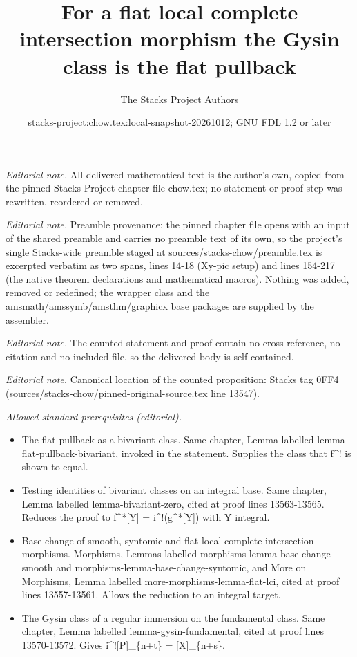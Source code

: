 \documentclass[10pt,a4paper]{amsart}
\title{For a flat local complete intersection morphism the Gysin class is the flat pullback}
\author{The Stacks Project Authors}
\date{stacks-project:chow.tex:local-snapshot-20261012; GNU FDL 1.2 or later}
\theoremstyle{plain}
\theoremstyle{definition}
\theoremstyle{remark}
\numberwithin{equation}{subsection}
\begin{document}
\maketitle
\noindent\textit{Editorial note.} All delivered mathematical text is the author's own, copied from the pinned Stacks Project chapter file chow.tex; no statement or proof step was rewritten, reordered or removed.\par\medskip
\noindent\textit{Editorial note.} Preamble provenance: the pinned chapter file opens with an input of the shared preamble and carries no preamble text of its own, so the project's single Stacks-wide preamble staged at sources/stacks-chow/preamble.tex is excerpted verbatim as two spans, lines 14-18 (Xy-pic setup) and lines 154-217 (the native theorem declarations and mathematical macros). Nothing was added, removed or redefined; the wrapper class and the amsmath/amssymb/amsthm/graphicx base packages are supplied by the assembler.\par\medskip
\noindent\textit{Editorial note.} The counted statement and proof contain no cross reference, no citation and no included file, so the delivered body is self contained.\par\medskip
\noindent\textit{Editorial note.} Canonical location of the counted proposition: Stacks tag 0FF4 (sources/stacks-chow/pinned-original-source.tex line 13547).\par\medskip
\noindent\textit{Allowed standard prerequisites (editorial).}\begin{itemize}
\item The flat pullback as a bivariant class. Same chapter, Lemma labelled lemma-flat-pullback-bivariant, invoked in the statement. Supplies the class that f\textasciicircum{}! is shown to equal.
\item Testing identities of bivariant classes on an integral base. Same chapter, Lemma labelled lemma-bivariant-zero, cited at proof lines 13563-13565. Reduces the proof to f\textasciicircum{}*[Y] = i\textasciicircum{}!(g\textasciicircum{}*[Y]) with Y integral.
\item Base change of smooth, syntomic and flat local complete intersection morphisms. Morphisms, Lemmas labelled morphisms-lemma-base-change-smooth and morphisms-lemma-base-change-syntomic, and More on Morphisms, Lemma labelled more-morphisms-lemma-flat-lci, cited at proof lines 13557-13561. Allows the reduction to an integral target.
\item The Gysin class of a regular immersion on the fundamental class. Same chapter, Lemma labelled lemma-gysin-fundamental, cited at proof lines 13570-13572. Gives i\textasciicircum{}![P]\_\{n+t\} = [X]\_\{n+s\}.
\end{itemize}\medskip
\end{document}
